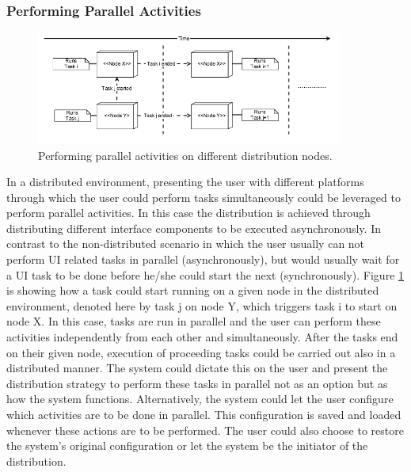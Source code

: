 \subsubsection{Performing Parallel Activities}
\begin{figure}[!htpb]
\includegraphics[width=0.9\textwidth, center, center]{figures/generic2}
\caption{Performing parallel activities on different distribution nodes.}
\label{fig:figure32}
\end{figure}
In a distributed environment, presenting the user with different platforms through which the user could perform tasks simultaneously could be leveraged to perform parallel activities. In this case the distribution is achieved through distributing different interface components to be executed asynchronously. In contrast to the non-distributed scenario in which the user usually can not perform UI related tasks in parallel (asynchronously), but would usually wait for a UI task to be done before he/she could start the next (synchronously). Figure \ref{fig:figure32} is showing how a task could start running on a given node in the distributed environment, denoted here by task j on node Y, which triggers task i to start on node X. In this case, tasks are run in parallel and the user can perform these activities independently from each other and simultaneously. After the tasks end on their given node, execution of proceeding tasks could be carried out also in a distributed manner. 
The system could dictate this on the user and present the distribution strategy to perform these tasks in parallel not as an option but as how the system functions. Alternatively, the system could let the user configure which activities are to be done in parallel. This configuration is saved and loaded whenever these actions are to be performed. The user could also choose to restore the system's original configuration or let the system be the initiator of the distribution.
    
